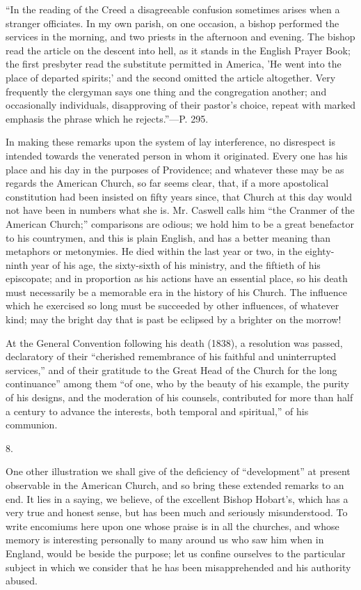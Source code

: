 ``In
the reading of the Creed a disagreeable confusion sometimes arises
when a stranger officiates. In my own parish, on one occasion, a
bishop performed the services in the morning, and two priests in the
afternoon and evening. The bishop read the article on the descent into
hell, as it stands in the English Prayer Book; the first presbyter
read the substitute permitted in America, 'He went into the place of
departed spirits;' and the second omitted the article altogether. Very
frequently the clergyman says one thing and the congregation another;
and occasionally individuals, disapproving of their pastor's choice,
repeat with marked emphasis the phrase which he rejects.''—P. 295.

In making these remarks upon the system of lay
interference, no disrespect is intended towards the venerated person
in whom it originated. Every one has his place and his day in the
purposes of Providence; and whatever these may be as regards the
American Church, so far seems clear, that, if a more apostolical
constitution had been insisted on fifty years since, that Church at
this day would not have been in numbers what she is. Mr. Caswell calls
him ``the Cranmer of the American Church;'' comparisons are odious; we
hold him to be a great benefactor to his countrymen, and this is plain
English, and has a better meaning than metaphors or metonymies. He
died within the last year or two, in the eighty-ninth year of his age,
the sixty-sixth of his ministry, and the fiftieth of his episcopate;
and in proportion as his actions have an essential place, so his
death must necessarily be a memorable era in the history of his
Church. The influence which he exercised so long must be succeeded by
other influences, of whatever kind; may the bright day that is past be
eclipsed by a brighter on the morrow!

At the General Convention following his death
(1838), a resolution was passed, declaratory of their ``cherished
remembrance of his faithful and uninterrupted services,'' and of their
gratitude to the Great Head of the Church for the long continuance''
among them ``of one, who by the beauty of his example, the purity of
his designs, and the moderation of his counsels, contributed for more
than half a century to advance the interests, both temporal and
spiritual,'' of his communion.

8.

One other illustration we shall give of the
deficiency of ``development'' at present observable in the American
Church, and so bring these extended remarks to an end. It lies in a
saying, we believe, of the excellent Bishop Hobart's, which has a very
true and honest sense, but has been much and seriously misunderstood.
To write encomiums here upon one whose praise is in all the churches,
and whose memory is interesting personally to many around us who saw
him when in England, would be beside the purpose; let us confine
ourselves to the particular subject in which we consider that he has
been misapprehended and his authority abused.

